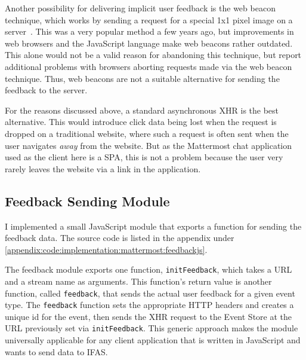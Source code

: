 Another possibility for delivering implicit user feedback is the web beacon technique, which works by sending a request for a special 1x1 pixel image on a server~\cite{Kohavi2012}.
This was a very popular method a few years ago, but improvements in web browsers and the JavaScript language make web beacons rather outdated.
This alone would not be a valid reason for abandoning this technique, but \citet{Kohavi2012} report additional problems with browsers aborting requests made via the web beacon technique.
Thus, web beacons are not a suitable alternative for sending the feedback to the server.

For the reasons discussed above, a standard asynchronous \ac{XHR} is the best alternative.
This would introduce click data being lost when the request is dropped on a traditional website, where such a request is often sent when the user navigates \emph{away} from the website.
But as the Mattermost chat application used as the client here is a \ac{SPA}, this is not a problem because the user very rarely leaves the website via a link in the application.


\subsection{Feedback Sending Module}

I implemented a small JavaScript module that exports a function for sending the feedback data.
The source code is listed in the appendix under \cref{appendix:code:implementation:mattermost:feedbackjs}.

The feedback module exports one function, \texttt{initFeedback}, which takes a URL and a stream name as arguments.
This function's return value is another function, called \texttt{feedback}, that sends the actual user feedback for a given event type.
The \texttt{feedback} function sets the appropriate \ac{HTTP} headers and creates a unique id for the event, then sends the \ac{XHR} request to the Event Store at the URL previously set via \texttt{initFeedback}.
This generic approach makes the module universally applicable for any client application that is written in JavaScript and wants to send data to \ac{IFAS}.

